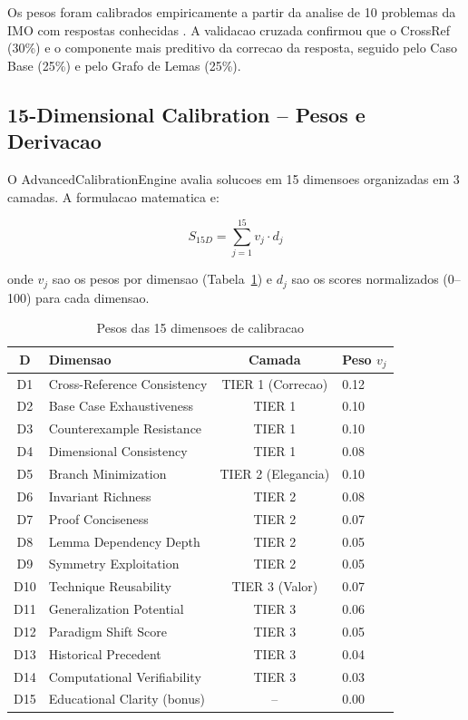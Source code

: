 \documentclass[5p]{elsarticle}
\begin{document}
Os pesos foram calibrados empiricamente a partir da analise de 10 problemas da
IMO com respostas conhecidas \cite{cohen1988}. A validacao cruzada confirmou que
o CrossRef (30\%) e o componente mais preditivo da correcao da resposta,
seguido pelo Caso Base (25\%) e pelo Grafo de Lemas (25\%).

\subsection{15-Dimensional Calibration -- Pesos e Derivacao}

O AdvancedCalibrationEngine \cite{calibration2026} avalia solucoes em 15
dimensoes organizadas em 3 camadas. A formulacao matematica e:

\begin{equation}\label{eq:cal15}
 S_{15D} = \sum_{j=1}^{15} v_j \cdot d_j
\end{equation}

onde $v_j$ sao os pesos por dimensao (Tabela~\ref{tab:weights}) e $d_j$ sao
os scores normalizados (0--100) para cada dimensao.

\begin{table}[H]
 \centering
 \caption{Pesos das 15 dimensoes de calibracao}
 \label{tab:weights}
 \footnotesize
 \begin{tabular}{clcp{3.5cm}}
 \toprule
 \textbf{D} & \textbf{Dimensao} & \textbf{Camada} & \textbf{Peso} $v_j$\\
 \midrule
 D1 & Cross-Reference Consistency & TIER 1 (Correcao) & 0.12\\
 D2 & Base Case Exhaustiveness & TIER 1 & 0.10\\
 D3 & Counterexample Resistance & TIER 1 & 0.10\\
 D4 & Dimensional Consistency & TIER 1 & 0.08\\
 \rowcolor{bluebg}
 D5 & Branch Minimization & TIER 2 (Elegancia) & 0.10\\
 D6 & Invariant Richness & TIER 2 & 0.08\\
 D7 & Proof Conciseness & TIER 2 & 0.07\\
 D8 & Lemma Dependency Depth & TIER 2 & 0.05\\
 D9 & Symmetry Exploitation & TIER 2 & 0.05\\
 \rowcolor{greenbg}
 D10 & Technique Reusability & TIER 3 (Valor) & 0.07\\
 D11 & Generalization Potential & TIER 3 & 0.06\\
 D12 & Paradigm Shift Score & TIER 3 & 0.05\\
 D13 & Historical Precedent & TIER 3 & 0.04\\
 D14 & Computational Verifiability & TIER 3 & 0.03\\
 D15 & Educational Clarity (bonus) & -- & 0.00\\
 \bottomrule
 \end{tabular}
\end{table}
\end{document}
